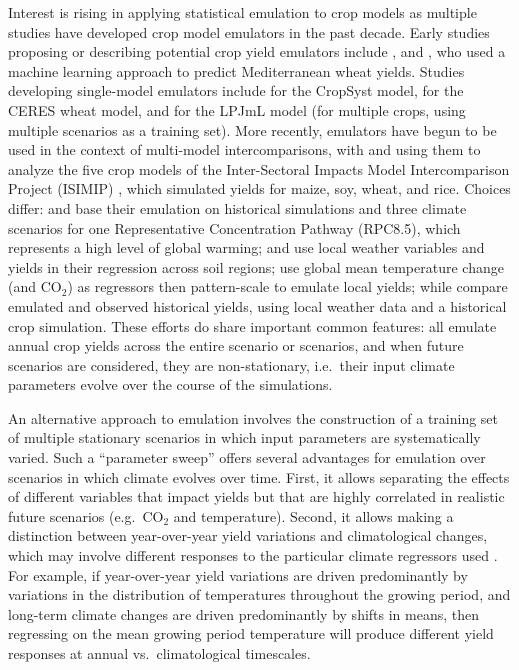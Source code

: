 \documentclass[gmd, manuscript]{copernicus} %
\begin{document}
Interest is rising in applying statistical emulation to crop models as multiple studies have developed crop model emulators in the past decade.
Early studies proposing or describing potential crop yield emulators include \citet{Howden2005, raisen2006, Lobell2010}, and \citet{Ferrise2011}, who used a machine learning approach to predict Mediterranean wheat yields. 
Studies developing single-model emulators include  \citet{Holzkamper2012} for the CropSyst model, \citet{RUANE2013a} for the CERES wheat model, and \citet{Oyebamiji15} for the LPJmL model (for multiple crops, using multiple scenarios as a training set). 
More recently, emulators have begun to be used in the context of multi-model intercomparisons, with \citet{BLANC2015, BLANC2017, Ostberg2018} and \citet{Mistry2017} using them to analyze the five crop models of the Inter-Sectoral Impacts Model Intercomparison Project (ISIMIP) \citep{Warszawski3228}, which simulated yields for maize, soy, wheat, and rice. 
Choices differ: \citet{BLANC2015} and \citet{BLANC2017} base their emulation on historical simulations and three climate scenarios for one Representative Concentration Pathway (RPC8.5), which represents a high level of global warming; and use local weather variables and yields in their regression across soil regions; \citet{Ostberg2018} use global mean temperature change (and CO$_2$) as regressors then pattern-scale to emulate local yields; while \citet{Mistry2017} compare emulated and observed historical yields, using local weather data and a historical crop simulation. 
These efforts do share important common features: all emulate annual crop yields across the entire scenario or scenarios, and when future scenarios are considered, they are non-stationary, i.e.\ their input climate parameters evolve over the course of the simulations.

An alternative approach to emulation involves the construction of a training set of multiple stationary scenarios in which input parameters are systematically varied. 
Such a ``parameter sweep'' offers several advantages for emulation over scenarios in which climate evolves over time. 
First, it allows separating the effects of different variables that impact yields but that are highly correlated in realistic future scenarios (e.g.\ CO$_2$ and temperature). 
Second, it allows making a distinction between year-over-year yield variations and climatological changes, which may involve different responses to the particular climate regressors used \citep[e.g.][]{Ruane2016}. 
For example, if year-over-year yield variations are driven predominantly by variations in the distribution of temperatures throughout the growing period, and long-term climate changes are driven predominantly by shifts in means, then regressing on the mean growing period temperature will produce different yield responses at annual vs.\ climatological timescales.  
\end{document}
